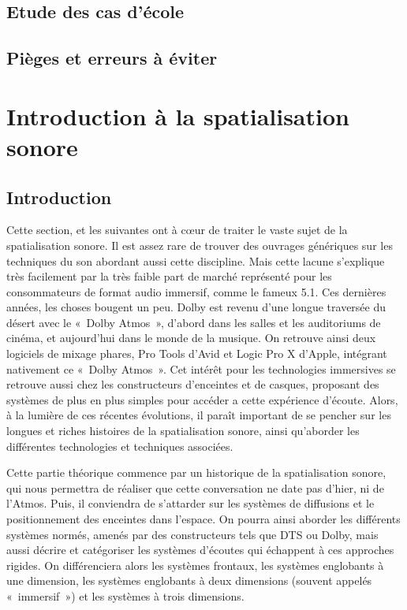 \documentclass[
  letterpaper,
  DIV=11,
  numbers=noendperiod]{scrreprt}
\begin{document}
\hypertarget{etude-des-cas-duxe9cole}{%
\chapter{Etude des cas d'école}\label{etude-des-cas-duxe9cole}}

\hypertarget{piuxe8ges-et-erreurs-uxe0-uxe9viter}{%
\chapter{Pièges et erreurs à
éviter}\label{piuxe8ges-et-erreurs-uxe0-uxe9viter}}

\part{Introduction à la spatialisation sonore}

\hypertarget{introduction}{%
\chapter{Introduction}\label{introduction}}

Cette section, et les suivantes ont à cœur de traiter le vaste sujet de
la spatialisation sonore. Il est assez rare de trouver des ouvrages
génériques sur les techniques du son abordant aussi cette discipline.
Mais cette lacune s'explique très facilement par la très faible part de
marché représenté pour les consommateurs de format audio immersif, comme
le fameux 5.1. Ces dernières années, les choses bougent un peu. Dolby
est revenu d'une longue traversée du désert avec le «~Dolby Atmos~»,
d'abord dans les salles et les auditoriums de cinéma, et aujourd'hui
dans le monde de la musique. On retrouve ainsi deux logiciels de mixage
phares, Pro Tools d'Avid et Logic Pro X d'Apple, intégrant nativement ce
«~Dolby Atmos~». Cet intérêt pour les technologies immersives se
retrouve aussi chez les constructeurs d'enceintes et de casques,
proposant des systèmes de plus en plus simples pour accéder a cette
expérience d'écoute. Alors, à la lumière de ces récentes évolutions, il
paraît important de se pencher sur les longues et riches histoires de la
spatialisation sonore, ainsi qu'aborder les différentes technologies et
techniques associées.

Cette partie théorique commence par un historique de la spatialisation
sonore, qui nous permettra de réaliser que cette conversation ne date
pas d'hier, ni de l'Atmos. Puis, il conviendra de s'attarder sur les
systèmes de diffusions et le positionnement des enceintes dans l'espace.
On pourra ainsi aborder les différents systèmes normés, amenés par des
constructeurs tels que DTS ou Dolby, mais aussi décrire et catégoriser
les systèmes d'écoutes qui échappent à ces approches rigides. On
différenciera alors les systèmes frontaux, les systèmes englobants à une
dimension, les systèmes englobants à deux dimensions (souvent appelés
«~immersif~») et les systèmes à trois dimensions.
\end{document}
